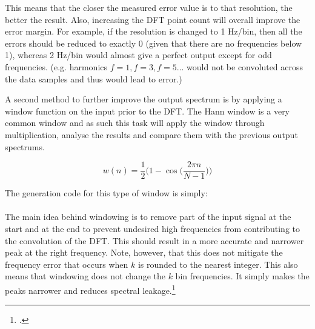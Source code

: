 This means that the closer the measured error value is to that resolution, the better the result. Also, increasing the DFT point count will overall improve the error margin. For example, if the resolution is changed to 1 Hz/bin, then all the errors should be reduced to exactly 0 (given that there are no frequencies below 1), whereas 2 Hz/bin would almost give a perfect output except for odd frequencies. (e.g. harmonics $f=1, f=3, f=5...$ would not be convoluted across the data samples and thus would lead to error.)


A second method to further improve the output spectrum is by applying a window function on the input prior to the DFT. The Hann window is a very common window and as such this task will apply the window through multiplication, analyse the results and compare them with the previous output spectrums.

\[w(n) = \frac{1}{2}\Bigg(1-\cos\Bigg(\frac{2\pi n}{N-1}\Bigg)\Bigg)\]



\newpage
The generation code for this type of window is simply:


\paragraph{}
The main idea behind windowing is to remove part of the input signal at the start and at the end to prevent undesired high frequencies from contributing to the convolution of the DFT. This should result in a more accurate and narrower peak at the right frequency. Note, however, that this does not mitigate the frequency error that occurs when $k$ is rounded to the nearest integer. This also means that windowing does not change the $k$ bin frequencies. It simply makes the peaks narrower and reduces spectral leakage.\footcite{book2_pp80_81}\\


